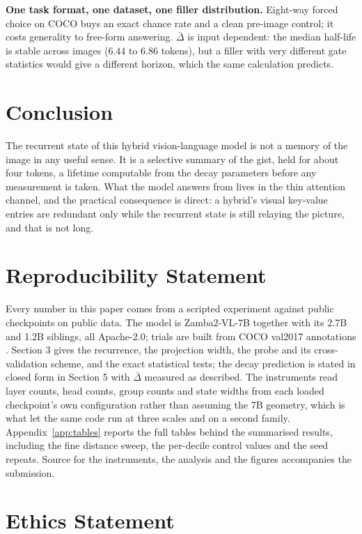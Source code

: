 \textbf{One task format, one dataset, one filler distribution.} Eight-way
forced choice on COCO buys an exact chance rate and a clean pre-image control;
it costs generality to free-form answering. $\bar{\Delta}$ is input
dependent: the median half-life is stable across images ($6.44$ to $6.86$
tokens), but a filler with very different gate statistics would give a
different horizon, which the same calculation predicts.

\section{Conclusion}

The recurrent state of this hybrid vision-language model is not a memory of
the image in any useful sense. It is a selective summary of the gist, held for
about four tokens, a lifetime computable from the decay parameters before any
measurement is taken. What the model answers from lives in the thin attention
channel, and the practical consequence is direct: a hybrid's visual key-value
entries are redundant only while the recurrent state is still relaying the
picture, and that is not long.

\section*{Reproducibility Statement}

Every number in this paper comes from a scripted experiment against public
checkpoints on public data. The model is Zamba2-VL-7B \citep{zamba2vl} together
with its 2.7B and 1.2B siblings, all Apache-2.0; trials are built from COCO
val2017 annotations \citep{lin2014coco}. Section 3 gives the recurrence, the
projection width, the probe and its cross-validation scheme, and the exact
statistical tests; the decay prediction is stated in closed form in Section 5
with $\bar{\Delta}$ measured as described. The instruments read layer counts,
head counts, group counts and state widths from each loaded checkpoint's own
configuration rather than assuming the 7B geometry, which is what let the same
code run at three scales and on a second family. Appendix~\ref{app:tables}
reports the full tables behind the summarised results, including the fine
distance sweep, the per-decile control values and the seed repeats. Source for
the instruments, the analysis and the figures accompanies the submission.

\section*{Ethics Statement}

